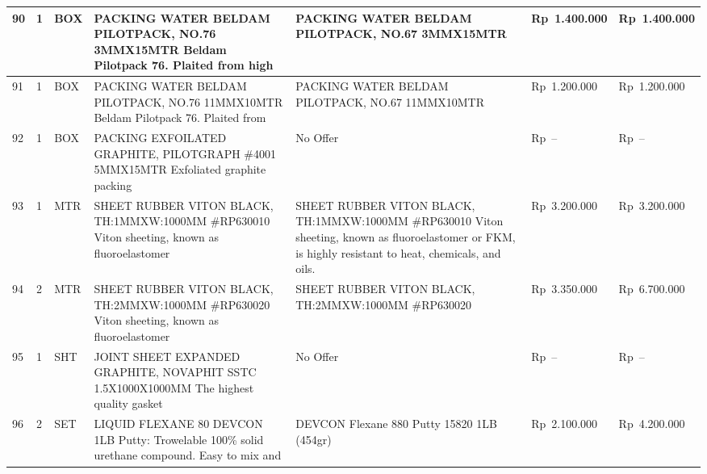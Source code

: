 \documentclass[9pt,a4paper,landscape]{article}
\begin{document}
\begin{longtable}{|C{0.6cm}|C{0.6cm}|C{0.8cm}|L{8.0cm}|L{9.5cm}|R{2.5cm}|R{2.5cm}|}
90 & 1 & BOX &
  PACKING WATER BELDAM PILOTPACK, NO.76\newline
  3MMX15MTR Beldam Pilotpack 76.\newline
  Plaited from high &
  PACKING WATER BELDAM PILOTPACK, NO.67 3MMX15MTR &
  Rp~1.400.000 & Rp~1.400.000 \\
\hline

91 & 1 & BOX &
  PACKING WATER BELDAM PILOTPACK, NO.76\newline
  11MMX10MTR Beldam Pilotpack 76.\newline
  Plaited from &
  PACKING WATER BELDAM PILOTPACK, NO.67 11MMX10MTR &
  Rp~1.200.000 & Rp~1.200.000 \\
\hline

92 & 1 & BOX &
  PACKING EXFOILATED GRAPHITE, PILOTGRAPH \#4001\newline
  5MMX15MTR Exfoliated graphite packing &
  \textcolor[gray]{0.5}{No Offer} &
  \textcolor[gray]{0.5}{Rp~--} & \textcolor[gray]{0.5}{Rp~--} \\
\hline

93 & 1 & MTR &
  SHEET RUBBER VITON BLACK, TH:1MMXW:1000MM\newline
  \#RP630010 Viton sheeting, known as fluoroelastomer &
  SHEET RUBBER VITON BLACK, TH:1MMXW:1000MM \#RP630010\newline
  Viton sheeting, known as fluoroelastomer or FKM, is highly resistant to heat, chemicals, and oils. &
  Rp~3.200.000 & Rp~3.200.000 \\
\hline

94 & 2 & MTR &
  SHEET RUBBER VITON BLACK, TH:2MMXW:1000MM\newline
  \#RP630020 Viton sheeting, known as fluoroelastomer &
  SHEET RUBBER VITON BLACK, TH:2MMXW:1000MM \#RP630020 &
  Rp~3.350.000 & Rp~6.700.000 \\
\hline

95 & 1 & SHT &
  JOINT SHEET EXPANDED GRAPHITE, NOVAPHIT SSTC\newline
  1.5X1000X1000MM The highest quality gasket &
  \textcolor[gray]{0.5}{No Offer} &
  \textcolor[gray]{0.5}{Rp~--} & \textcolor[gray]{0.5}{Rp~--} \\
\hline

96 & 2 & SET &
  LIQUID FLEXANE 80 DEVCON 1LB\newline
  Putty: Trowelable 100\% solid urethane compound.\newline
  Easy to mix and &
  DEVCON Flexane 880 Putty 15820 1LB (454gr) &
  Rp~2.100.000 & Rp~4.200.000 \\
\hline


\end{longtable}
\end{document}
